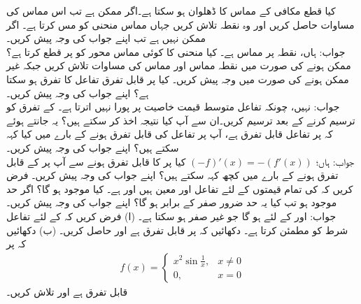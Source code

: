 کیا قطع مکافی  کے مماس کا ڈھلوان  ہو سکتا ہے۔اگر ممکن ہے تب اس مماس کی مساوات حاصل کریں اور وہ نقطہ تلاش کریں جہاں مماس منحنی کو مس کرتا ہے۔ اگر ممکن نہیں ہے تب اپنے جواب کی وجہ پیش کریں۔\\
جواب:\quad
ہاں،  نقطہ  پر مماس ہے۔
کیا منحنی  کا کوئی مماس  محور کو  پر قطع کرتا ہے؟ ممکن ہونے کی صورت میں نقطہ مماس اور مماس کی مساوات تلاش کریں جبکہ غیر ممکن ہونے کی صورت میں وجہ پیش کریں۔ 
کیا  پر قابل تفرق تفاعل کا تفرق  ہو سکتا ہے؟ اپنے جواب کی وجہ پیش کریں۔ \\
جواب:\quad
نہیں، چونکہ تفاعل  متوسط قیمت خاصیت پر پورا نہیں اترتا ہے۔
 کے تفرق کو ترسیم کرنے کے بعد  ترسیم کریں۔ان سے آپ کیا نتیجہ اخذ کر سکتے ہیں؟
یہ جانتے ہوئے کہ  پر تفاعل  قابل تفرق ہے، آپ  پر تفاعل  کی قابل تفرق ہونے کے بارے میں کیا کہہ سکتے ہیں؟ اپنے جواب کی وجہ پیش کریں۔\\
جواب:\quad
ہاں؛ 
$(-f)'(x)=-(f'(x))$
کیا  پر  کا قابل تفرق ہونے سے آپ  پر  کے قابل تفرق ہونے کے بارے میں کچھ کہہ سکتے ہیں؟ اپنے جواب کی وجہ پیش کریں۔
فرض کریں کہ  کی تمام قیمتوں کے لئے تفاعل  اور  معین ہیں اور  ہے۔ کیا  موجود ہو گا؟ اگر حد موجود ہو تب کیا یہ حد ضرور صفر کے برابر ہو گا؟ اپنے جواب کی وجہ پیش کریں۔\\
جواب:\quad
{} اور  کے لئے  ہو گا جو غیر صفر ہو سکتا ہے۔ 
(ا) فرض کریں کہ  کے لئے تفاعل  شرط  کو مطمئن کرتا ہے۔ دکھائیں کہ  پر  قابل تفرق ہے اور  حاصل کریں۔ (ب) دکھائیں کہ  پر
\begin{align*}
f(x)=
\begin{cases}
x^2\sin \frac{1}{x},&x\ne 0\\
0,&x=0
\end{cases}
\end{align*}
قابل تفرق ہے اور  تلاش کریں۔


